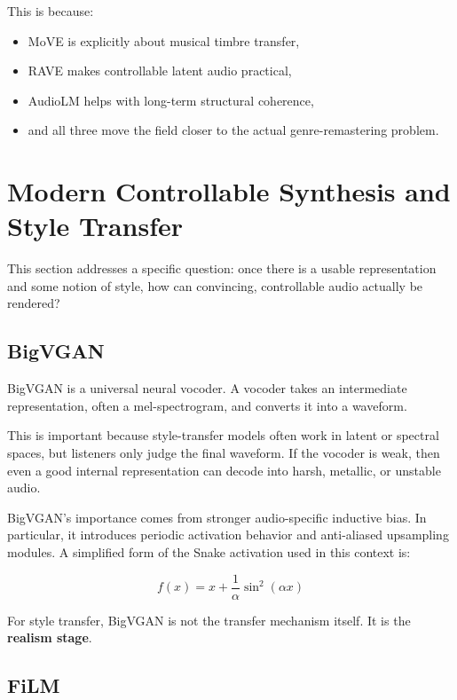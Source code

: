 \documentclass[11pt]{article}
\begin{document}
This is because:

\begin{itemize}
\item MoVE is explicitly about musical timbre transfer,
\item RAVE makes controllable latent audio practical,
\item AudioLM helps with long-term structural coherence,
\item and all three move the field closer to the actual genre-remastering problem.
\end{itemize}

\section{Modern Controllable Synthesis and Style Transfer}

This section addresses a specific question: once there is a usable representation and some notion of style, how can convincing, controllable audio actually be rendered?

\subsection{BigVGAN}

BigVGAN is a universal neural vocoder. A vocoder takes an intermediate representation, often a mel-spectrogram, and converts it into a waveform.

This is important because style-transfer models often work in latent or spectral spaces, but listeners only judge the final waveform. If the vocoder is weak, then even a good internal representation can decode into harsh, metallic, or unstable audio.

BigVGAN's importance comes from stronger audio-specific inductive bias. In particular, it introduces periodic activation behavior and anti-aliased upsampling modules. A simplified form of the Snake activation used in this context is:

\begin{equation*}
f(x)=x+\frac{1}{\alpha}\sin^2(\alpha x)
\end{equation*}

For style transfer, BigVGAN is not the transfer mechanism itself. It is the \textbf{realism stage}.

\subsection{FiLM}
\end{document}
